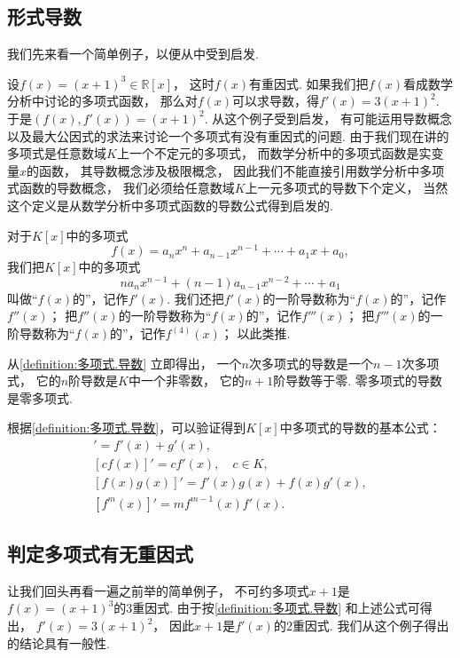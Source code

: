 \subsection{形式导数}
我们先来看一个简单例子，以便从中受到启发.

设\(f(x) = (x+1)^3 \in \mathbb{R}[x]\)，
这时\(f(x)\)有重因式.
如果我们把\(f(x)\)看成数学分析中讨论的多项式函数，
那么对\(f(x)\)可以求导数，得\(f'(x) = 3(x+1)^2\).
于是\((f(x),f'(x)) = (x+1)^2\).
从这个例子受到启发，
有可能运用导数概念以及最大公因式的求法来讨论一个多项式有没有重因式的问题.
由于我们现在讲的多项式是任意数域\(K\)上一个不定元的多项式，
而数学分析中的多项式函数是实变量\(x\)的函数，
其导数概念涉及极限概念，
因此我们不能直接引用数学分析中多项式函数的导数概念，
我们必须给任意数域\(K\)上一元多项式的导数下个定义，
当然这个定义是从数学分析中多项式函数的导数公式得到启发的.

\begin{definition}\label{definition:多项式.导数}
对于\(K[x]\)中的多项式\[
	f(x) = a_n x^n + a_{n-1} x^{n-1} + \dotsb + a_1 x + a_0,
\]
我们把\(K[x]\)中的多项式\[
	n a_n x^{n-1} + (n-1) a_{n-1} x^{n-2} + \dotsb + a_1
\]
叫做“\(f(x)\)的”，记作\(f'(x)\).
我们还把\(f'(x)\)的一阶导数称为“\(f(x)\)的”，记作\(f''(x)\)；
把\(f''(x)\)的一阶导数称为“\(f(x)\)的”，记作\(f'''(x)\)；
把\(f'''(x)\)的一阶导数称为“\(f(x)\)的”，记作\(f^{(4)}(x)\)；
以此类推.
\end{definition}

从\cref{definition:多项式.导数} 立即得出，
一个\(n\)次多项式的导数是一个\(n-1\)次多项式，
它的\(n\)阶导数是\(K\)中一个非零数，
它的\(n+1\)阶导数等于零.
零多项式的导数是零多项式.

根据\cref{definition:多项式.导数}，可以验证得到\(K[x]\)中多项式的导数的基本公式：\begin{gather}
	[f(x)+g(x)]' = f'(x) + g'(x), \\
	[c f(x)]' = c f'(x), \quad c \in K, \\
	[f(x) g(x)]' = f'(x) g(x) + f(x) g'(x), \\
	[f^m(x)]' = m f^{m-1}(x) f'(x).
\end{gather}

\subsection{判定多项式有无重因式}
让我们回头再看一遍之前举的简单例子，
不可约多项式\(x+1\)是\(f(x) = (x+1)^3\)的\(3\)重因式.
由于按\cref{definition:多项式.导数} 和上述公式可得出，
\(f'(x) = 3(x+1)^2\)，
因此\(x+1\)是\(f'(x)\)的\(2\)重因式.
我们从这个例子得出的结论具有一般性.

